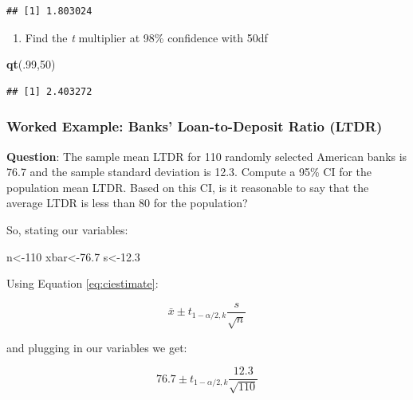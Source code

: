 \documentclass[
  openany]{book}
\newenvironment{Shaded}{\begin{snugshade}}{\end{snugshade}}
\newcommand{\DecValTok}[1]{\textcolor[rgb]{0.00,0.00,0.81}{#1}}
\newcommand{\FloatTok}[1]{\textcolor[rgb]{0.00,0.00,0.81}{#1}}
\newcommand{\FunctionTok}[1]{\textcolor[rgb]{0.13,0.29,0.53}{\textbf{#1}}}
\newcommand{\NormalTok}[1]{#1}
\newcommand{\OtherTok}[1]{\textcolor[rgb]{0.56,0.35,0.01}{#1}}
\providecommand{\tightlist}{%
  \setlength{\itemsep}{0pt}\setlength{\parskip}{0pt}}
\begin{document}
\begin{verbatim}
## [1] 1.803024
\end{verbatim}

\begin{enumerate}
\def\labelenumi{\arabic{enumi}.}
\setcounter{enumi}{2}
\tightlist
\item
  Find the \emph{t} multiplier at 98\% confidence with 50df
\end{enumerate}

\begin{Shaded}
\begin{Highlighting}[]
\FunctionTok{qt}\NormalTok{(.}\DecValTok{99}\NormalTok{,}\DecValTok{50}\NormalTok{)}
\end{Highlighting}
\end{Shaded}

\begin{verbatim}
## [1] 2.403272
\end{verbatim}

\subsubsection{Worked Example: Banks' Loan-to-Deposit Ratio (LTDR)}\label{worked-example-banks-loan-to-deposit-ratio-ltdr}

\textbf{Question}: The sample mean LTDR for 110 randomly selected American banks is 76.7 and the sample standard deviation is 12.3. Compute a 95\% CI for the population mean LTDR. Based on this CI, is it reasonable to say that the average LTDR is less than 80 for the population?

So, stating our variables:

\begin{Shaded}
\begin{Highlighting}[]
\NormalTok{n}\OtherTok{\textless{}{-}}\DecValTok{110}
\NormalTok{xbar}\OtherTok{\textless{}{-}}\FloatTok{76.7}
\NormalTok{s}\OtherTok{\textless{}{-}}\FloatTok{12.3}
\end{Highlighting}
\end{Shaded}

Using Equation \eqref{eq:ciestimate}:

\begin{equation}
\bar{x}\pm t_{1-\alpha/2,k}\frac{s}{\sqrt{n}}
\end{equation}

and plugging in our variables we get:

\begin{equation}
76.7\pm t_{1-\alpha/2,k}\frac{12.3}{\sqrt{110}}
\end{equation}
\end{document}
